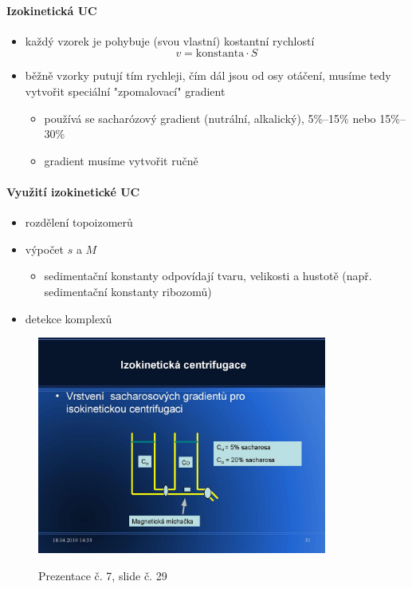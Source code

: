 \documentclass[DIV=8]{scrreprt}
\begin{document}
\paragraph{Izokinetická UC}
\begin{itemize}[nosep]
    \item každý vzorek je pohybuje (svou vlastní) kostantní rychlostí
    \[v = \text{konstanta} \cdot S\]
    \item běžně vzorky putují tím rychleji, čím dál jsou od osy otáčení, musíme tedy vytvořit speciální "zpomalovací" gradient
\begin{itemize}[nosep]
    \item používá se sacharózový gradient (nutrální, alkalický), 5\%--15\% nebo 15\%--30\%
    \item gradient musíme vytvořit ručně
\end{itemize}

\end{itemize}



\paragraph{Využití izokinetické UC}
\begin{itemize}[nosep]
    \item rozdělení topoizomerů
    \item výpočet \(s\) a \(M\)
\begin{itemize}[nosep]
    \item sedimentační konstanty odpovídají tvaru, velikosti a hustotě (např. sedimentační konstanty ribozomů)
\end{itemize}

    \item detekce komplexů
\end{itemize}



\begin{figure}
    \caption{Prezentace č. 7, slide č. 29}
    \includegraphics[width=0.85\textwidth]{slides-7/slide-29.jpg}
    \centering
    \label{slides-7-slide-29}
\end{figure}
\end{document}
